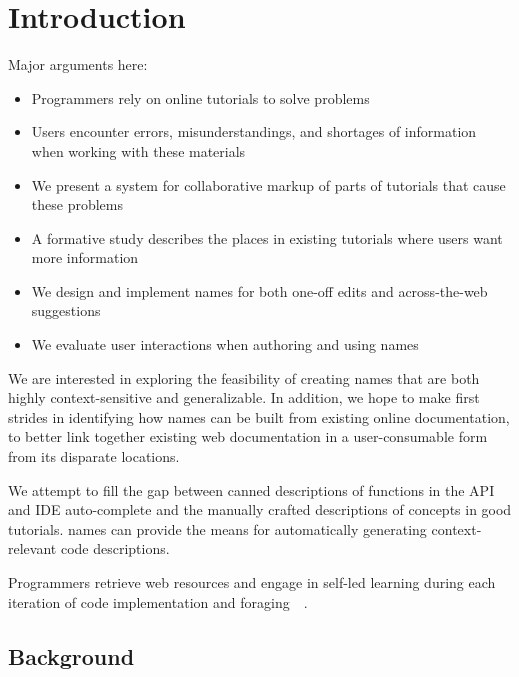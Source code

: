 \section{Introduction}

Major arguments here:
\begin{itemize}
\item Programmers rely on online tutorials to solve problems
\item Users encounter errors, misunderstandings, and shortages of information when working with these materials
\item We present a system for collaborative markup of parts of tutorials that cause these problems
\item A formative study describes the places in existing tutorials where users want more information
\item We design and implement \Glspl{name} for both one-off edits and across-the-web suggestions
\item We evaluate user interactions when authoring and using \Glspl{name}
\end{itemize}

We are interested in exploring the feasibility of creating \glspl{name} that are both highly context-sensitive and generalizable.
In addition, we hope to make first strides in identifying how \glspl{name} can be built from existing online documentation, to better link together existing web documentation in a user-consumable form from its disparate locations.

We attempt to fill the gap between canned descriptions of functions in the API and IDE auto-complete and the manually crafted descriptions of concepts in good tutorials.
\Glspl{name} can provide the means for automatically generating context-relevant code descriptions.

Programmers retrieve web resources and engage in self-led learning during each iteration of code implementation and foraging~\cite{brandt_two_2009}~\cite{brandt_example-centric_2010}.


\subsection{Background}

